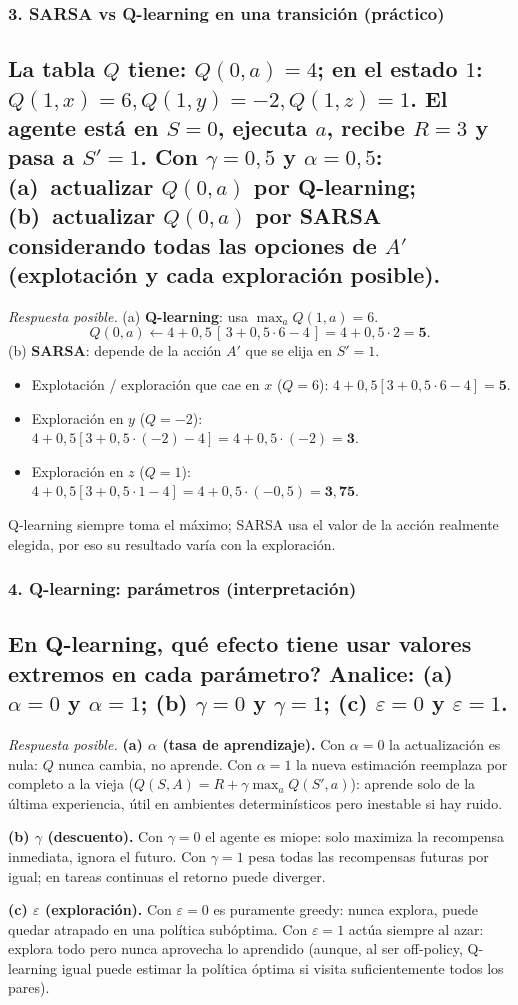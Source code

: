 \documentclass[11pt, a4paper]{article}
\newcommand{\pregunta}[1]{\subsection{#1}}
\newcommand{\eje}[1]{\subsubsection{#1}}
\begin{document}
\eje{3. SARSA vs Q-learning en una transici\'on (pr\'actico)}
\pregunta{La tabla $Q$ tiene: $Q(0,a)=4$; en el estado $1$: $Q(1,x)=6, Q(1,y)={-}2, Q(1,z)=1$. El agente est\'a en $S=0$, ejecuta $a$, recibe $R=3$ y pasa a $S'=1$. Con $\gamma=0{,}5$ y $\alpha=0{,}5$: (a)~actualizar $Q(0,a)$ por \textbf{Q-learning}; (b)~actualizar $Q(0,a)$ por \textbf{SARSA} considerando todas las opciones de $A'$ (explotaci\'on y cada exploraci\'on posible).}

\begin{respuesta}
\textit{Respuesta posible.} (a) \textbf{Q-learning}: usa $\max_a Q(1,a)=6$.
\[
Q(0,a) \leftarrow 4 + 0{,}5\,[\,3 + 0{,}5\cdot 6 - 4\,] = 4 + 0{,}5\cdot 2 = \mathbf{5}.
\]
(b) \textbf{SARSA}: depende de la acci\'on $A'$ que se elija en $S'=1$.
\begin{itemize}[nosep]
\item Explotaci\'on / exploraci\'on que cae en $x$ ($Q=6$): $4+0{,}5[3+0{,}5\cdot6-4]=\mathbf{5}$.
\item Exploraci\'on en $y$ ($Q=-2$): $4+0{,}5[3+0{,}5\cdot(-2)-4]=4+0{,}5\cdot(-2)=\mathbf{3}$.
\item Exploraci\'on en $z$ ($Q=1$): $4+0{,}5[3+0{,}5\cdot1-4]=4+0{,}5\cdot(-0{,}5)=\mathbf{3{,}75}$.
\end{itemize}
Q-learning siempre toma el m\'aximo; SARSA usa el valor de la acci\'on realmente elegida, por eso su resultado var\'ia con la exploraci\'on.
\end{respuesta}

\eje{4. Q-learning: par\'ametros (interpretaci\'on)}
\pregunta{En Q-learning, \textquestiondown qu\'e efecto tiene usar valores extremos en cada par\'ametro? Analice: (a) $\alpha=0$ y $\alpha=1$; (b) $\gamma=0$ y $\gamma=1$; (c) $\varepsilon=0$ y $\varepsilon=1$.}

\begin{respuesta}
\textit{Respuesta posible.}
\textbf{(a) $\alpha$ (tasa de aprendizaje).} Con $\alpha=0$ la actualizaci\'on es nula: $Q$ nunca cambia, no aprende. Con $\alpha=1$ la nueva estimaci\'on reemplaza por completo a la vieja ($Q(S,A)=R+\gamma\max_a Q(S',a)$): aprende solo de la \'ultima experiencia, \'util en ambientes determin\'isticos pero inestable si hay ruido.

\textbf{(b) $\gamma$ (descuento).} Con $\gamma=0$ el agente es miope: solo maximiza la recompensa inmediata, ignora el futuro. Con $\gamma=1$ pesa todas las recompensas futuras por igual; en tareas continuas el retorno puede diverger.

\textbf{(c) $\varepsilon$ (exploraci\'on).} Con $\varepsilon=0$ es puramente greedy: nunca explora, puede quedar atrapado en una pol\'itica sub\'optima. Con $\varepsilon=1$ act\'ua siempre al azar: explora todo pero nunca aprovecha lo aprendido (aunque, al ser off-policy, Q-learning igual puede estimar la pol\'itica \'optima si visita suficientemente todos los pares).
\end{respuesta}
\end{document}

